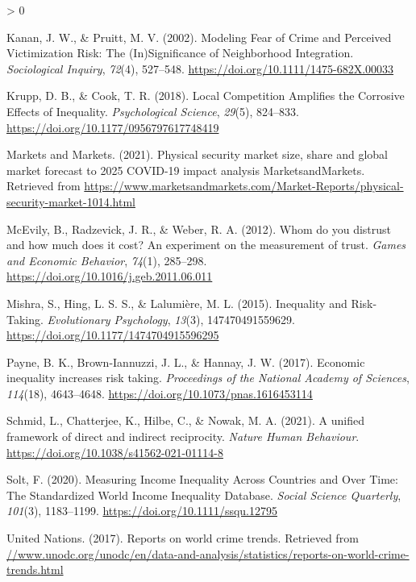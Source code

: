 \documentclass[
  english,
  man]{apa6}
\newlength{\cslhangindent}
\newenvironment{CSLReferences}[2] %
 {%
  \setlength{\parindent}{0pt}
  \ifodd #1 \everypar{\setlength{\hangindent}{\cslhangindent}}\ignorespaces\fi
  \ifnum #2 > 0
  \setlength{\parskip}{#2\baselineskip}
  \fi
 }%
 {}
\begin{document}
\begin{CSLReferences}{1}{0}
\leavevmode\hypertarget{ref-kanan2002}{}%
Kanan, J. W., \& Pruitt, M. V. (2002). Modeling Fear of Crime and Perceived Victimization Risk: The (In)Significance of Neighborhood Integration. \emph{Sociological Inquiry}, \emph{72}(4), 527--548. \url{https://doi.org/10.1111/1475-682X.00033}

\leavevmode\hypertarget{ref-krupp2018}{}%
Krupp, D. B., \& Cook, T. R. (2018). Local Competition Amplifies the Corrosive Effects of Inequality. \emph{Psychological Science}, \emph{29}(5), 824--833. \url{https://doi.org/10.1177/0956797617748419}

\leavevmode\hypertarget{ref-marketsandmarkets2021}{}%
Markets and Markets. (2021). Physical security market size, share and global market forecast to 2025 \textbar{} COVID-19 impact analysis \textbar{} MarketsandMarkets. Retrieved from \url{https://www.marketsandmarkets.com/Market-Reports/physical-security-market-1014.html}

\leavevmode\hypertarget{ref-mcevily2012}{}%
McEvily, B., Radzevick, J. R., \& Weber, R. A. (2012). Whom do you distrust and how much does it cost? An experiment on the measurement of trust. \emph{Games and Economic Behavior}, \emph{74}(1), 285--298. \url{https://doi.org/10.1016/j.geb.2011.06.011}

\leavevmode\hypertarget{ref-mishra2015}{}%
Mishra, S., Hing, L. S. S., \& Lalumière, M. L. (2015). Inequality and Risk-Taking. \emph{Evolutionary Psychology}, \emph{13}(3), 147470491559629. \url{https://doi.org/10.1177/1474704915596295}

\leavevmode\hypertarget{ref-payne2017}{}%
Payne, B. K., Brown-Iannuzzi, J. L., \& Hannay, J. W. (2017). Economic inequality increases risk taking. \emph{Proceedings of the National Academy of Sciences}, \emph{114}(18), 4643--4648. \url{https://doi.org/10.1073/pnas.1616453114}

\leavevmode\hypertarget{ref-schmid2021}{}%
Schmid, L., Chatterjee, K., Hilbe, C., \& Nowak, M. A. (2021). A unified framework of direct and indirect reciprocity. \emph{Nature Human Behaviour}. \url{https://doi.org/10.1038/s41562-021-01114-8}

\leavevmode\hypertarget{ref-solt2020}{}%
Solt, F. (2020). Measuring Income Inequality Across Countries and Over Time: The Standardized World Income Inequality Database. \emph{Social Science Quarterly}, \emph{101}(3), 1183--1199. \url{https://doi.org/10.1111/ssqu.12795}

\leavevmode\hypertarget{ref-unitednations2017}{}%
United Nations. (2017). Reports on world crime trends. Retrieved from \href{https:////www.unodc.org/unodc/en/data-and-analysis/statistics/reports-on-world-crime-trends.html}{//www.unodc.org/unodc/en/data-and-analysis/statistics/reports-on-world-crime-trends.html}


\end{CSLReferences}
\end{document}
